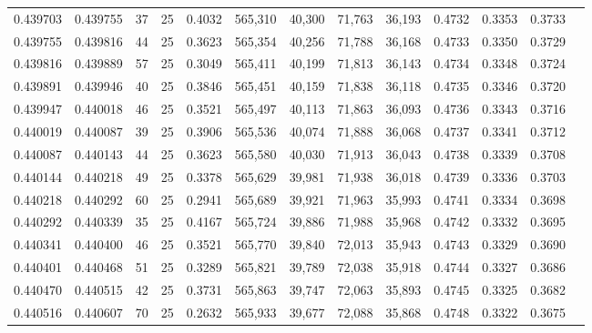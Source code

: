 \begin{tabular}{rrrrrrrrrrrrr}
0.439703 & 0.439755 &    37 &  25 &                                     0.4032 & 565,310 &  40,300 &  71,763 &  36,193 & 0.4732 & 0.3353 & 0.3733 \\
0.439755 & 0.439816 &    44 &  25 &                                     0.3623 & 565,354 &  40,256 &  71,788 &  36,168 & 0.4733 & 0.3350 & 0.3729 \\
0.439816 & 0.439889 &    57 &  25 &                                     0.3049 & 565,411 &  40,199 &  71,813 &  36,143 & 0.4734 & 0.3348 & 0.3724 \\
0.439891 & 0.439946 &    40 &  25 &                                     0.3846 & 565,451 &  40,159 &  71,838 &  36,118 & 0.4735 & 0.3346 & 0.3720 \\
0.439947 & 0.440018 &    46 &  25 &                                     0.3521 & 565,497 &  40,113 &  71,863 &  36,093 & 0.4736 & 0.3343 & 0.3716 \\
0.440019 & 0.440087 &    39 &  25 &                                     0.3906 & 565,536 &  40,074 &  71,888 &  36,068 & 0.4737 & 0.3341 & 0.3712 \\
0.440087 & 0.440143 &    44 &  25 &                                     0.3623 & 565,580 &  40,030 &  71,913 &  36,043 & 0.4738 & 0.3339 & 0.3708 \\
0.440144 & 0.440218 &    49 &  25 &                                     0.3378 & 565,629 &  39,981 &  71,938 &  36,018 & 0.4739 & 0.3336 & 0.3703 \\
0.440218 & 0.440292 &    60 &  25 &                                     0.2941 & 565,689 &  39,921 &  71,963 &  35,993 & 0.4741 & 0.3334 & 0.3698 \\
0.440292 & 0.440339 &    35 &  25 &                                     0.4167 & 565,724 &  39,886 &  71,988 &  35,968 & 0.4742 & 0.3332 & 0.3695 \\
0.440341 & 0.440400 &    46 &  25 &                                     0.3521 & 565,770 &  39,840 &  72,013 &  35,943 & 0.4743 & 0.3329 & 0.3690 \\
0.440401 & 0.440468 &    51 &  25 &                                     0.3289 & 565,821 &  39,789 &  72,038 &  35,918 & 0.4744 & 0.3327 & 0.3686 \\
0.440470 & 0.440515 &    42 &  25 &                                     0.3731 & 565,863 &  39,747 &  72,063 &  35,893 & 0.4745 & 0.3325 & 0.3682 \\
0.440516 & 0.440607 &    70 &  25 &                                     0.2632 & 565,933 &  39,677 &  72,088 &  35,868 & 0.4748 & 0.3322 & 0.3675 \\

\end{tabular}
